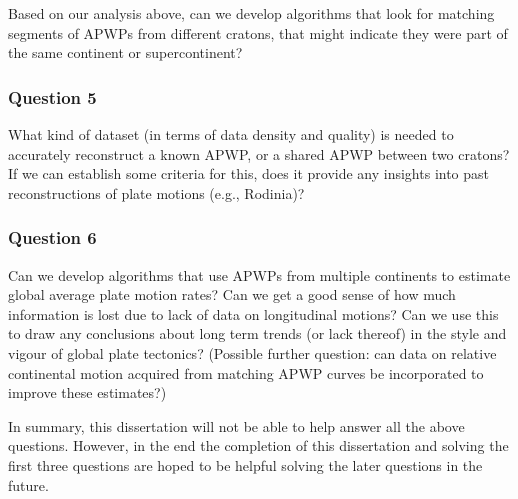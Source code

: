 Based on our analysis above, can we develop algorithms that look for matching
segments of APWPs from different cratons, that might indicate they were part of
the same continent or supercontinent?

\subsubsection{Question 5}

What kind of dataset (in terms of data density and quality) is needed to
accurately reconstruct a known APWP, or a shared APWP between two cratons? If
we can establish some criteria for this, does it provide any insights into past
reconstructions of plate motions (e.g., Rodinia)?

\subsubsection{Question 6}

Can we develop algorithms that use APWPs from multiple continents to estimate
global average plate motion rates? Can we get a good sense of how much
information is lost due to lack of data on longitudinal motions? Can we use
this to draw any conclusions about long term trends (or lack thereof) in the
style and vigour of global plate tectonics? (Possible further question: can
data on relative continental motion acquired from matching APWP curves be
incorporated to improve these estimates?)

In summary, this dissertation will not be able to help answer all the above
questions. However, in the end the completion of this dissertation and solving
the first three questions are hoped to be helpful solving the later questions in
the future.

